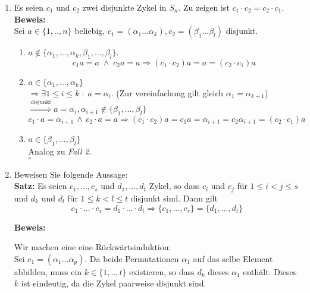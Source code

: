 \documentclass[11pt,a4paper,ngerman]{article}
\begin{document}
\begin{enumerate}[\bfseries a)]
\item Es seien $c_1$ und $c_2$ zwei disjunkte Zykel in $S_n$. Zu zeigen ist $c_1 \cdot c_2 = c_2 \cdot c_1$.\\

\textbf{Beweis:}\\
Sei $a \in \{ 1 ,.. ,n \}$ beliebig, $c_1 = \left( \alpha_1 ... \alpha_k \right), c_2 = \left( \beta_1  ...  \beta_l \right)$ disjunkt.\\

\begin{enumerate}

\item $a \not\in \{ \alpha_1, ... , \alpha_k , \beta_1 , ... , \beta_l \}$.\\
$$c_1 a = a \; \land \; c_2 a = a \Longrightarrow (c_1 \cdot c_2) a = a = (c_2 \cdot c_1) a$$

\item $a \in \{ \alpha_1 , ... , \alpha_k\}$\\
$\Rightarrow \exists 1 \leq i \leq k \; : \; a = \alpha_i$. (Zur vereinfachung gilt gleich $\alpha_1 = \alpha_{k+1}$)\\
$\stackrel{\text{disjunkt}}{\Rightarrow} a=\alpha_i, \alpha_{i+1} \not\in \{ \beta_1 , ... , \beta_l \}$
$$
c_1 \cdot a = \alpha_{i+1} \, \land \, c_2 \cdot a = a \Longrightarrow (c_1 \cdot c_2) a = c_1 a = \alpha_{i+1} = c_2 \alpha_{i+1} = (c_2 \cdot c_1) a
$$

\item $a \in \{ \beta_1 , ... , \beta_l \}$\\
Analog zu \emph{Fall 2}.\\

\mbox{} \hfill $\square$
\end{enumerate}


\item Beweisen Sie folgende Aussage:\\
\textbf{Satz:} Es seien $c_1, ..., c_s$ und $d_1, ... , d_t$ Zykel, so dass $c_i$ und $c_j$ für $1 \leq i < j \leq s$ und $d_k$ und $d_l$ für $1 \leq k < l \leq t$ disjunkt sind. Dann gilt
$$
c_1 \cdot ... \cdot c_s = d_1 \cdot ... \cdot d_t \Rightarrow \{ c_1 , ..., c_s \} = \{ d_1 , ... , d_t \}
$$

\textbf{Beweis:}

Wir machen eine eine Rückwärtsinduktion:\\

Sei $c_1 = (\alpha_1 ... \alpha_p)$. Da beide Permutationen $\alpha_1$ auf das selbe Element abbilden, muss ein $k \in \{ 1,.., t \}$ existieren, so dass $d_k$ dieses $\alpha_1$ enthält. Dieses $k$ ist eindeutig, da die Zykel paarweise disjunkt sind.\\


\end{enumerate}
\end{document}
